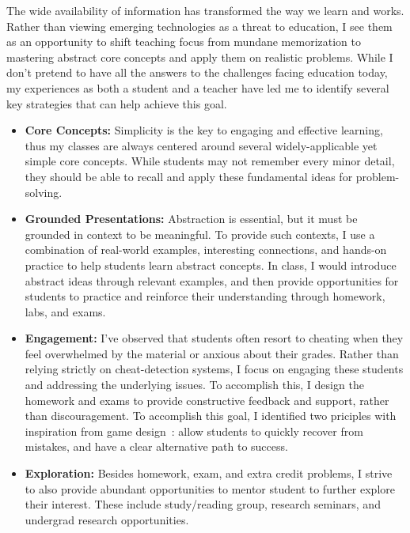 \documentclass[11pt,a4paper,sans]{moderncv} %
\begin{document}
The wide availability of information has transformed the way we learn and works. 
Rather than viewing emerging technologies as a threat to education, I see them as an opportunity to shift teaching focus from mundane memorization to mastering abstract core concepts and apply them on realistic problems.
While I don't pretend to have all the answers to the challenges facing education today, my experiences as both a student and a teacher have led me to identify several key strategies that can help achieve this goal.
\begin{itemize}
  \item \textbf{Core Concepts:}
  Simplicity is the key to engaging and effective learning, thus my classes are always centered around several widely-applicable yet simple core concepts. 
  While students may not remember every minor detail, they should be able to recall and apply these fundamental ideas for problem-solving.
  \item \textbf{Grounded Presentations:} 
  Abstraction is essential, but it must be grounded in context to be meaningful. 
  To provide such contexts, I use a combination of real-world examples, interesting connections, and hands-on practice to help students learn abstract concepts. 
  In class, I would introduce abstract ideas through relevant examples, and then provide opportunities for students to practice and reinforce their understanding through homework, labs, and exams.
  \item \textbf{Engagement:}
  I've observed that students often resort to cheating when they feel overwhelmed by the material or anxious about their grades. 
  Rather than relying strictly on cheat-detection systems, I focus on engaging these students and addressing the underlying issues. 
  To accomplish this, I design the homework and exams to provide constructive feedback and support, rather than discouragement. 
  To accomplish this goal, I identified two priciples with inspiration from game design~\cite{engelstein_AchievementRelockedLoss_2020,lewis_MotivationalGameDesign_2012}: allow students to quickly recover from mistakes, and have a clear alternative path to success.
  \item \textbf{Exploration:} Besides homework, exam, and extra credit problems, I strive to also provide abundant opportunities to mentor student to further explore their interest. 
  These include study/reading group, research seminars, and undergrad research opportunities.
\end{itemize}
\end{document}
